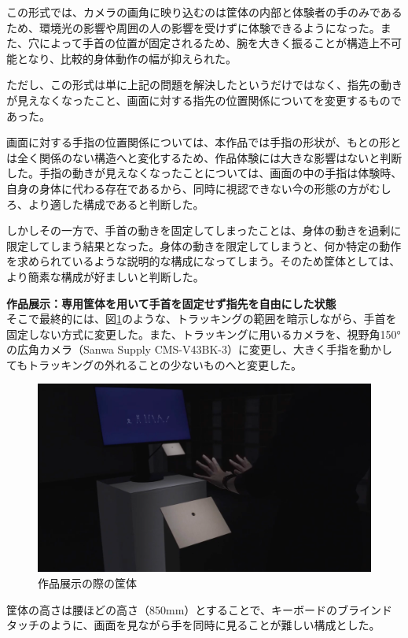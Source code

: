 この形式では、カメラの画角に映り込むのは筐体の内部と体験者の手のみであるため、環境光の影響や周囲の人の影響を受けずに体験できるようになった。また、穴によって手首の位置が固定されるため、腕を大きく振ることが構造上不可能となり、比較的身体動作の幅が抑えられた。

ただし、この形式は単に上記の問題を解決したというだけではなく、指先の動きが見えなくなったこと、画面に対する指先の位置関係についてを変更するものであった。

画面に対する手指の位置関係については、本作品では手指の形状が、もとの形とは全く関係のない構造へと変化するため、作品体験には大きな影響はないと判断した。手指の動きが見えなくなったことについては、画面の中の手指は体験時、自身の身体に代わる存在であるから、同時に視認できない今の形態の方がむしろ、より適した構成であると判断した。

しかしその一方で、手首の動きを固定してしまったことは、身体の動きを過剰に限定してしまう結果となった。身体の動きを限定してしまうと、何か特定の動作を求められているような説明的な構成になってしまう。そのため筐体としては、より簡素な構成が好ましいと判断した。


\textbf{作品展示：専用筐体を用いて手首を固定せず指先を自由にした状態}\\
そこで最終的には、図\ref{fig:kyotai_ver2}のような、トラッキングの範囲を暗示しながら、手首を固定しない方式に変更した。また、トラッキングに用いるカメラを、視野角150°の広角カメラ（Sanwa Supply CMS-V43BK-3）に変更し、大きく手指を動かしてもトラッキングの外れることの少ないものへと変更した。

\begin{figure}[H]
  \centering
  \includegraphics[width=12cm]{img/kyotai_ver2.png}
  \caption{作品展示の際の筐体}
  \label{fig:kyotai_ver2}
\end{figure}

筐体の高さは腰ほどの高さ（850mm）とすることで、キーボードのブラインドタッチのように、画面を見ながら手を同時に見ることが難しい構成とした。

